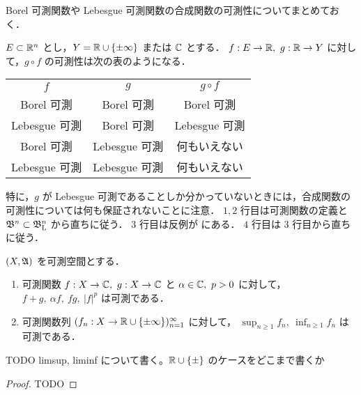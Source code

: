 \begin{remark}
    Borel 可測関数や Lebesgue 可測関数の合成関数の可測性についてまとめておく．

    $E\subset\mathbb{R}^n$ とし，$Y=\mathbb{R}\cup\{\pm\infty\}$ または $\mathbb{C}$ とする．
    $f:E\to\mathbb{R},\ g:\mathbb{R}\to Y$ に対して，$g\circ f$ の可測性は次の表のようになる．

    \begin{table}[h]
        \centering
        \begin{tabular}{|c|c||c|}
            \hline
            $f$ & $g$ & $g\circ f$\\
            \hhline{|=|=#=|}
            Borel 可測 & Borel 可測 & Borel 可測\\
            \hline
            Lebesgue 可測 & Borel 可測 & Lebesgue 可測\\
            \hline
            Borel 可測 & Lebesgue 可測 & 何もいえない\\
            \hline
            Lebesgue 可測 & Lebesgue 可測 & 何もいえない\\
            \hline
        \end{tabular}
    \end{table}

    特に，$g$ が Lebesgue 可測であることしか分かっていないときには，合成関数の可測性については何も保証されないことに注意．
    $1,2$ 行目は可測関数の定義と $\mathfrak{B}^n\subset\mathfrak{B}_{\mathrm{L}}^n$ から直ちに従う．
    $3$ 行目は反例が \cite[\S2 Exercise 9]{Fo99}\cite[pp.72--73]{It63} にある．
    $4$ 行目は $3$ 行目から直ちに従う．
\end{remark}

\begin{theorem}\label{thm:elementary_measuable_functions}
    $(X,\mathfrak{A})$ を可測空間とする．
    \begin{enumerate}
        \item 可測関数 $f:X\to\Cbb,\ g:X\to\Cbb$ と $\alpha\in\Cbb,\ p>0$ に対して，$f+g,\ \alpha f,\ fg,\ |f|^p$ は可測である．
        \item 可測関数列 $(f_n:X\to\mathbb{R}\cup\{\pm\infty\})_{n=1}^\infty$ に対して，
            $\displaystyle\sup_{n\ge1}f_n,\ \inf_{n\ge1}f_n$ は可測である．
    \end{enumerate}
    {\color{red} TODO limsup, liminf について書く。$\mathbb{R}\cup\{\pm\}$ のケースをどこまで書くか}
\end{theorem}

\begin{proof}
    {\color{red} TODO}
\end{proof}

